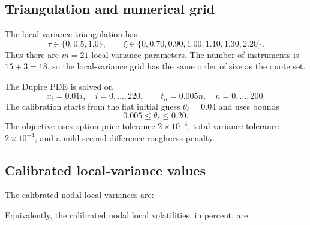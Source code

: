 \documentclass[11pt]{article}
\newcommand{\1}{\mathbf{1}}
\begin{document}
\subsection{Triangulation and numerical grid}

The local-variance triangulation has
\[
  \tau\in\{0,0.5,1.0\},\qquad
  \xi\in\{0,0.70,0.90,1.00,1.10,1.30,2.20\}.
\]
Thus there are $m=21$ local-variance parameters. The number of instruments is
$15+3=18$, so the local-variance grid has the same order of size as the quote set.

The Dupire PDE is solved on
\[
  x_i=0.01i,\quad i=0,\ldots,220,
  \qquad
  t_n=0.005n,\quad n=0,\ldots,200.
\]
The calibration starts from the flat initial guess $\theta_\ell=0.04$ and uses bounds
\[
  0.005\le \theta_\ell\le0.20.
\]
The objective uses option price tolerance $2\times10^{-4}$, total variance tolerance
$2\times10^{-4}$, and a mild second-difference roughness penalty.

\subsection{Calibrated local-variance values}

The calibrated nodal local variances are:

\begin{table}[h!]
\centering
\caption{Calibrated nodal local variances $\theta_{\ell}$.}
\label{tab:calibrated_variances}
\end{table}

Equivalently, the calibrated nodal local volatilities, in percent, are:

\begin{table}[h!]
\centering
\caption{Calibrated nodal local volatilities $100\sqrt{\theta_{\ell}}$.}
\label{tab:calibrated_vols}
\end{table}
\end{document}
